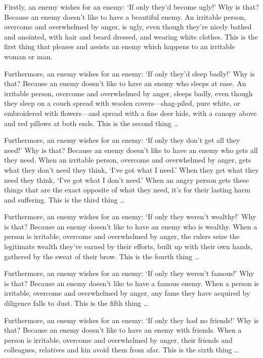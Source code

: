 \documentclass[12pt,openany]{book}%
\begin{document}
Firstly, an enemy wishes for an enemy: ‘If only they’d become ugly!’ Why is that? Because an enemy doesn’t like to have a beautiful enemy. An irritable person, overcome and overwhelmed by anger, is ugly, even though they’re nicely bathed and anointed, with hair and beard dressed, and wearing white clothes. This is the first thing that pleases and assists an enemy which happens to an irritable woman or man. 

Furthermore, an enemy wishes for an enemy: ‘If only they’d sleep badly!’ Why is that? Because an enemy doesn’t like to have an enemy who sleeps at ease. An irritable person, overcome and overwhelmed by anger, sleeps badly, even though they sleep on a couch spread with woolen covers—shag-piled, pure white, or embroidered with flowers—and spread with a fine deer hide, with a canopy above and red pillows at both ends. This is the second thing … 

Furthermore, an enemy wishes for an enemy: ‘If only they don’t get all they need!’ Why is that? Because an enemy doesn’t like to have an enemy who gets all they need. When an irritable person, overcome and overwhelmed by anger, gets what they don’t need they think, ‘I’ve got what I need.’ When they get what they need they think, ‘I’ve got what I don’t need.’ When an angry person gets these things that are the exact opposite of what they need, it’s for their lasting harm and suffering. This is the third thing … 

Furthermore, an enemy wishes for an enemy: ‘If only they weren’t wealthy!’ Why is that? Because an enemy doesn’t like to have an enemy who is wealthy. When a person is irritable, overcome and overwhelmed by anger, the rulers seize the legitimate wealth they’ve earned by their efforts, built up with their own hands, gathered by the sweat of their brow. This is the fourth thing … 

Furthermore, an enemy wishes for an enemy: ‘If only they weren’t famous!’ Why is that? Because an enemy doesn’t like to have a famous enemy. When a person is irritable, overcome and overwhelmed by anger, any fame they have acquired by diligence falls to dust. This is the fifth thing … 

Furthermore, an enemy wishes for an enemy: ‘If only they had no friends!’ Why is that? Because an enemy doesn’t like to have an enemy with friends. When a person is irritable, overcome and overwhelmed by anger, their friends and colleagues, relatives and kin avoid them from afar. This is the sixth thing … 
\end{document}

